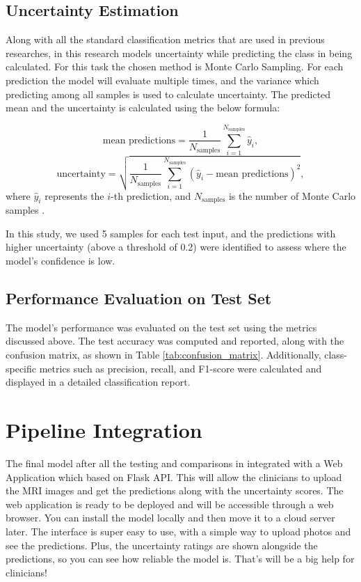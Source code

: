 \documentclass[12pt,onecolumn]{report}
\begin{document}
\subsection{Uncertainty Estimation}
Along with all the standard classification metrics that are used in previous researches, in this research models uncertainty while predicting the class in being calculated. For this task the chosen method is Monte Carlo Sampling. For each prediction the model will evaluate multiple times, and the variance which predicting among all samples is used to calculate uncertainty. The predicted mean and the uncertainty is calculated using the below formula:

\begin{equation}
    \text{mean predictions} = \frac{1}{N_{\text{samples}}} \sum_{i=1}^{N_{\text{samples}}} \hat{y}_i,
\end{equation}
\begin{equation}
    \text{uncertainty} = \sqrt{\frac{1}{N_{\text{samples}}} \sum_{i=1}^{N_{\text{samples}}} (\hat{y}_i - \text{mean predictions})^2},
\end{equation}
where \( \hat{y}_i \) represents the \( i \)-th prediction, and \( N_{\text{samples}} \) is the number of Monte Carlo samples \cite{2016Gal}.

In this study, we used 5 samples for each test input, and the predictions with higher uncertainty (above a threshold of 0.2) were identified to assess where the model's confidence is low.

\subsection{Performance Evaluation on Test Set}

The model's performance was evaluated on the test set using the metrics discussed above. The test accuracy was computed and reported, along with the confusion matrix, as shown in Table \ref{tab:confusion_matrix}. Additionally, class-specific metrics such as precision, recall, and F1-score were calculated and displayed in a detailed classification report.

\section{Pipeline Integration}

The final model after all the testing and comparisons in integrated with a Web Application which based on Flask API. This will allow the clinicians to upload the MRI images and get the predictions along with the uncertainty scores. The web application is ready to be deployed and will be accessible through a web browser. You can install the model locally and then move it to a cloud server later. The interface is super easy to use, with a simple way to upload photos and see the predictions. Plus, the uncertainty ratings are shown alongside the predictions, so you can see how reliable the model is. That’s will be a big help for clinicians!
\end{document}
